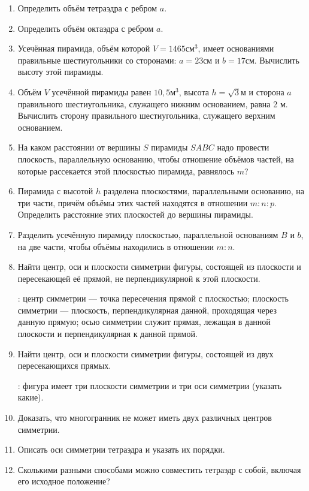 \begin{enumerate}
\item
Определить объём тетраэдра с ребром $a$.

\item
Определить объём октаэдра с ребром $a$.

\item
Усечённая пирамида, объём которой $V = 1465 \text{см}^3$, имеет основаниями правильные шестиугольники со сторонами: $a = 23 \text{см}$ и $b = 17 \text{см}$.
Вычислить высоту этой пирамиды.

\item
Объём $V$ усечённой пирамиды равен $10{,}5\text{м}^3$, высота $h = \sqrt{3}\text{м}$ и сторона $a$ правильного шестиугольника, служащего нижним основанием, равна 2 м.
Вычислить сторону правильного шестиугольника, служащего верхним основанием.

\item
На каком расстоянии от вершины $S$ пирамиды $SABC$ надо провести плоскость, параллельную основанию, чтобы отношение объёмов частей, на которые рассекается этой плоскостью пирамида, равнялось $m$?

\item
Пирамида с высотой $h$ разделена плоскостями, параллельными основанию, на три части, причём объёмы этих частей находятся в отношении $m : n : p$.
Определить расстояние этих плоскостей до вершины пирамиды.

\item
Разделить усечённую пирамиду плоскостью, параллельной основаниям $B$ и $b$, на две части, чтобы объёмы находились в отношении $m:n$.

\item
Найти центр, оси и плоскости симметрии фигуры, состоящей из плоскости и пересекающей её прямой, не перпендикулярной к этой плоскости.

: центр симметрии — точка пересечения прямой с плоскостью;
плоскость симметрии — плоскость, перпендикулярная данной, проходящая через данную прямую;
осью симметрии служит прямая, лежащая в данной плоскости и перпендикулярная к данной прямой.

\item
Найти центр, оси и плоскости симметрии фигуры, состоящей из двух пересекающихся прямых.

: фигура имеет три плоскости симметрии и три оси симметрии (указать какие).

\item Доказать, что многогранник не может иметь двух различных центров симметрии.

\item Описать оси симметрии тетраэдра и указать их порядки.

\item Сколькими разными способами можно совместить тетраэдр с собой, включая его исходное положение?
\end{enumerate}
